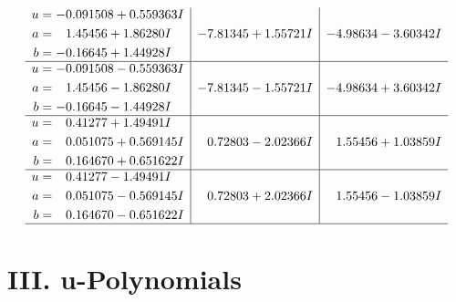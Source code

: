 \documentclass[1p]{elsarticle_modified}
\theoremstyle{definition}
\begin{document}
$$\begin{array}{c|c|c}
\begin{aligned}
u &= -0.091508 + 0.559363 I \\
a &= \phantom{-}1.45456 + 1.86280 I \\
b &= -0.16645 + 1.44928 I\end{aligned}
 & -7.81345 + 1.55721 I & -4.98634 - 3.60342 I \\ \hline\begin{aligned}
u &= -0.091508 - 0.559363 I \\
a &= \phantom{-}1.45456 - 1.86280 I \\
b &= -0.16645 - 1.44928 I\end{aligned}
 & -7.81345 - 1.55721 I & -4.98634 + 3.60342 I \\ \hline\begin{aligned}
u &= \phantom{-}0.41277 + 1.49491 I \\
a &= \phantom{-}0.051075 + 0.569145 I \\
b &= \phantom{-}0.164670 + 0.651622 I\end{aligned}
 & \phantom{-}0.72803 - 2.02366 I & \phantom{-}1.55456 + 1.03859 I \\ \hline\begin{aligned}
u &= \phantom{-}0.41277 - 1.49491 I \\
a &= \phantom{-}0.051075 - 0.569145 I \\
b &= \phantom{-}0.164670 - 0.651622 I\end{aligned}
 & \phantom{-}0.72803 + 2.02366 I & \phantom{-}1.55456 - 1.03859 I\\
 \hline 
 \end{array}$$\newpage
\newpage\renewcommand{\arraystretch}{1}
\centering \section*{ III. u-Polynomials}
\end{document}
